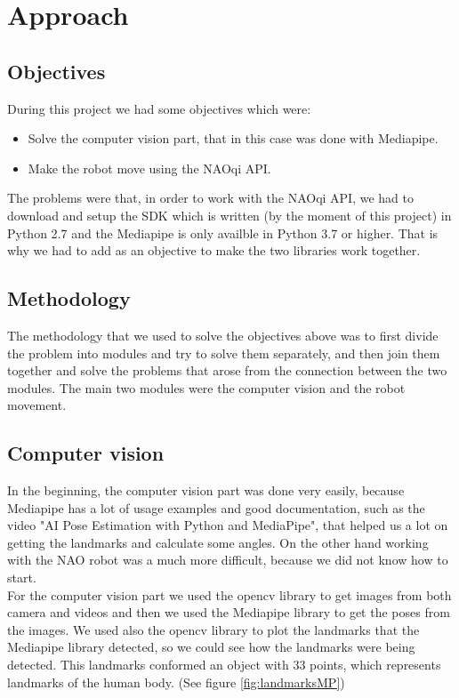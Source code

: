 \documentclass[conference]{IEEEtran}
\begin{document}
\section{Approach}

\subsection{Objectives}

During this project we had some objectives which were:
\begin{itemize}
\item Solve the computer vision part, that in this case was done with Mediapipe.
\item Make the robot move using the NAOqi API.

\end{itemize}
The problems were that, in order to work with the NAOqi API, we had to download and setup the SDK which is written (by the moment of this project) in Python 2.7 and the Mediapipe is only availble in Python 3.7 or higher. That is why we had to add as an objective to make the two libraries work together.


\subsection{Methodology}
The methodology that we used to solve the objectives above was to first divide the problem into modules and try to solve them separately, and then join them together and solve the problems that arose from the connection between the two modules.
The main two modules were the computer vision and the robot movement.


\subsection{Computer vision}
In the beginning, the computer vision part was done very easily, because Mediapipe has a lot of usage examples and good documentation, such as the video "AI Pose Estimation with Python and MediaPipe"\cite{b4}, that helped us a lot on getting the landmarks and calculate some angles. On the other hand working with the NAO robot was a much more difficult, because we did not know how to start.
\\
For the computer vision part we used the opencv library to get images from both camera and videos and then we used the Mediapipe library to get the poses from the images.
We used also the opencv library to plot the landmarks that the Mediapipe library detected, so  we could see how the landmarks were being detected. This landmarks conformed an object with 33 points, which represents landmarks of the human body. (See figure \ref{fig:landmarksMP})
\end{document}
